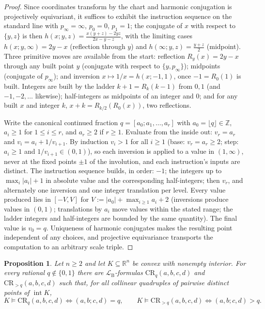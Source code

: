 \documentclass[11pt]{amsart}
\newtheorem{proposition}[theorem]{Proposition}
\theoremstyle{definition}
\newcommand{\R}{\mathbb{R}}
\newcommand{\Z}{\mathbb{Z}}
\newcommand{\LB}{\mathcal{L}_{\mathrm{B}}}
\newcommand{\interior}{\operatorname{int}}
\begin{document}
\begin{proof}
Since coordinates transform by the chart and harmonic conjugation is
projectively equivariant, it suffices to exhibit the instruction sequence on
the standard line with $p_\infty=\infty$, $p_0=0$, $p_1=1$; the conjugate of
$x$ with respect to $\{y,z\}$ is then $h(x;y,z)=\frac{x(y+z)-2yz}{2x-y-z}$,
with the limiting cases $h(x;y,\infty)=2y-x$ \textup(reflection through
$y$\textup) and $h(\infty;y,z)=\frac{y+z}{2}$ \textup(midpoint\textup).
Three primitive moves are available from the start:
reflection $R_y(x)=2y-x$ through any built point $y$ \textup(conjugate with
respect to $\{y,p_\infty\}$\textup); midpoints
\textup(conjugate of $p_\infty$\textup); and inversion
$x\mapsto1/x=h(x;-1,1)$, once $-1=R_0(1)$ is built. Integers are built by the
ladder $k+1=R_k(k-1)$ from $0,1$ \textup(and $-1,-2,\dots$ likewise\textup);
half-integers as midpoints of an integer and $0$; and for any built $x$ and
integer $k$, $x+k=R_{k/2}(R_0(x))$, two reflections.

Write the canonical continued fraction $q=[a_0;a_1,\dots,a_r]$ with
$a_0=\lfloor q\rfloor\in\Z$, $a_i\ge1$ for $1\le i\le r$, and $a_r\ge2$ if
$r\ge1$. Evaluate from the inside out: $v_r=a_r$ and
$v_{i}=a_i+1/v_{i+1}$. By induction $v_i>1$ for all $i\ge1$ \textup(base:
$v_r=a_r\ge2$; step: $a_i\ge1$ and $1/v_{i+1}\in(0,1)$\textup), so each
inversion is applied to a value in $(1,\infty)$, never at the fixed points
$\pm1$ of the involution, and each instruction's inputs are distinct.
The instruction sequence builds, in order: $-1$; the integers up to
$\max_i|a_i|+1$ in absolute value and the corresponding half-integers; then
$v_r$, and alternately one inversion and one integer translation per level.
Every value produced lies in
$[-V,V]$ for $V:=|a_0|+\max_{i\ge1}a_i+2$ \textup(inversions produce values
in $(0,1)$; translations by $a_i$ move values within the stated range;
the ladder integers and half-integers are bounded by the same
quantity\textup). The final value is $v_0=q$. Uniqueness of harmonic
conjugates makes the resulting point independent of any choices, and
projective equivariance transports the computation to an arbitrary scale
triple.
\end{proof}

\begin{proposition}\label{prop:crq}
Let $n\ge2$ and let $K\subseteq\R^n$ be convex with nonempty interior. For
every rational $q\notin\{0,1\}$ there are $\LB$-formulas
$\mathrm{CR}_q(a,b,c,d)$ and $\mathrm{CR}_{>q}(a,b,c,d)$ such that, for all
collinear quadruples of pairwise distinct points of $\interior K$,
\[
K\models\mathrm{CR}_q(a,b,c,d)\iff(a,b;c,d)=q,
\qquad
K\models\mathrm{CR}_{>q}(a,b,c,d)\iff(a,b;c,d)>q .
\]
\end{proposition}
\end{document}

